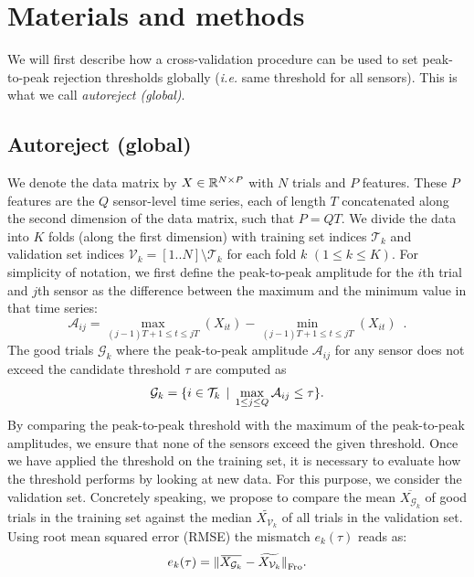 \section{Materials and methods}
%
We will first describe how a cross-validation procedure can be used to set peak-to-peak rejection thresholds globally (\textit{i.e.} same threshold for all sensors). This is what we call \textit{autoreject (global)}.

\subsection{Autoreject (global)}
\label{sec:auto_global}
We denote the data matrix by $X \in \mathbb{R}^{N \times P}$ with $N$ trials and $P$ features. These $P$ features are the $Q$ sensor-level time series, each of length $T$ concatenated along the second dimension of the data matrix, such that $P=QT$. We divide the data into $K$ folds (along the first dimension) with training set indices $\mathcal{T}_{k}$ and validation set indices $\mathcal{V}_{k}=[1..N] \setminus {\mathcal{T}_k}$ for each fold $k$ $(1 \leq k \leq K)$. For simplicity of notation, we first define the peak-to-peak amplitude for the $i$th trial and $j$th sensor as the difference between the maximum and the minimum value in that time series:
\begin{equation}
\mathcal{A}_{ij} = \max_{(j-1)T+1 \leq t \leq jT} (X_{it}) - \min_{(j-1)T+1 \leq t \leq jT} (X_{it}) \enspace .
\end{equation}
The good trials $\mathcal{G}_k$ where the peak-to-peak amplitude $\mathcal{A}_{ij}$ for any sensor does not exceed the candidate threshold $\tau$ are computed as
\begin{equation}
\mathcal{G}_k = \{i \in \mathcal{T}_{k} \, \mid \, \max_{1 \leq j \leq Q} \mathcal{A}_{ij} \leq \tau\}.
\end{equation}
By comparing the peak-to-peak threshold with the maximum of the peak-to-peak amplitudes, we ensure that none of the sensors exceed the given threshold. Once we have applied the threshold on the training set, it is necessary to evaluate how the threshold performs by looking at new data. For this purpose, we consider the validation set. Concretely speaking, we propose to compare the mean $\overbar{X_{\mathcal{G}_k}}$ of good trials in the training set against the median $\widetilde{X_{\mathcal{V}_k}}$ of all trials in the validation set. Using root mean squared error (RMSE) the mismatch $e_{k}(\tau)$ reads as:
\begin{equation}
 e_{k}(\tau) = \fro{\overbar{X_{\mathcal{G}_k}} - \widetilde{X_{\mathcal{V}_k}}}.
\label{eq:err} 
\end{equation}
